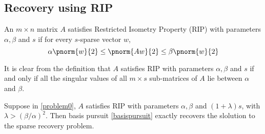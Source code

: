 \subsection{Recovery using RIP}

\begin{definition}
	An $m\times n$ matrix $A$ satisfies Restricted Isometry Property (RIP) with
	parameters $\alpha, \beta$ and $s$ if for every $s$-sparse vector
	$w$,
	\begin{equation*}
		\alpha \pnorm{w}{2}\leq \pnorm{Aw}{2}\leq \beta\pnorm{w}{2}
	\end{equation*}
\end{definition}

\begin{remark}\label{ripremark}
	It is clear from the definition that $A$ satisfies RIP with
	parameters $\alpha, \beta$ and $s$ if
	and only if all the singular values of all $m\times s$ sub-matrices
	of $A$ lie between $\alpha$ and $\beta$.
\end{remark}

\begin{theorem}\label{ripimpliesexact}
	Suppose in \eqref{problem0}, $A$ satisfies RIP with parameters
	$\alpha, \beta$ and $(1+\lambda)s$, with $\lambda >
	(\beta/\alpha)^2$. Then basis pursuit \eqref{basispursuit}
	exactly recovers the slolution to the sparse recovery problem.
\end{theorem}

